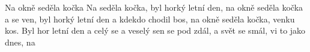 \begin{TEXT}{Na okně seděla kočka}
\SLOKA* {}  \NL
Na  seděla kočka, byl horký letní den,\NL
na okně seděla kočka a  se ven,\NL
byl horký letní den a kdekdo chodil bos,\NL
na okně seděla kočka, venku  kos.\NL
Byl hor letní den a celý  se \NL
a  veselý sen se pod  zdál,\NL
a  svět se smál, vi to jako dnes,\NL
na     
\end{TEXT}
